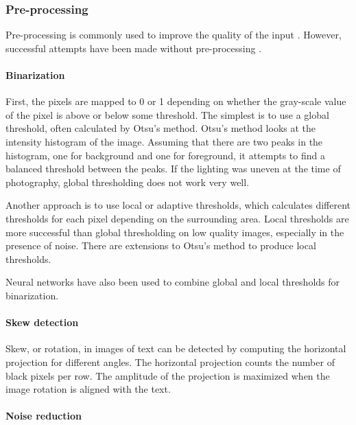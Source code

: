 \subsubsection{Pre-processing}

Pre-processing is commonly used to improve the quality of the input \cite{HWR_survey}. However, successful attempts have been made without pre-processing \cite{FornesCnnCategorization}.

\paragraph{Binarization}

First, the pixels are mapped to 0 or 1 depending on whether the gray-scale value of the pixel is above or below some threshold. The simplest is to use a global threshold, often calculated by Otsu's method. Otsu's method looks at the intensity histogram of the image. Assuming that there are two peaks in the histogram, one for background and one for foreground, it attempts to find a balanced threshold between the peaks. If the lighting was uneven at the time of photography, global thresholding does not work very well.

Another approach is to use local or adaptive thresholds, which calculates different thresholds for each pixel depending on the surrounding area. Local thresholds are more successful than global thresholding on low quality images, especially in the presence of noise. There are extensions to Otsu's method to produce local thresholds.

Neural networks have also been used to combine global and local thresholds for binarization.

\paragraph{Skew detection}

Skew, or rotation, in images of text can be detected by computing the horizontal projection for different angles. The horizontal projection counts the number of black pixels per row. The amplitude of the projection is maximized when the image rotation is aligned with the text.

\paragraph{Noise reduction}


